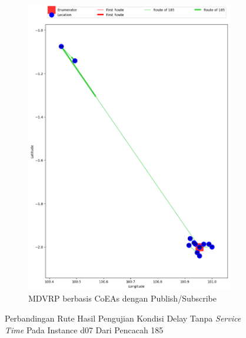 \begin{figure}[H]\ContinuedFloat
	\centering
	\begin{subfigure}[t]{\textwidth}
		\centering
		\includegraphics[width=\textwidth]{Resources/Images/delayed_7/real_m15_n100_delayed_7_185_pubsub_coes}
		\caption{MDVRP berbasis CoEAs dengan Publish/Subscribe}
		\label{fig:real_m15_n100_delayed_7_185_pubsub_coes}
	\end{subfigure}
	\caption{Perbandingan Rute Hasil Pengujian Kondisi Delay Tanpa \textit{Service Time} Pada Instance d07 Dari Pencacah 185}
	\label{fig:real_m15_n100_delayed_7_185_contd}
\end{figure}



